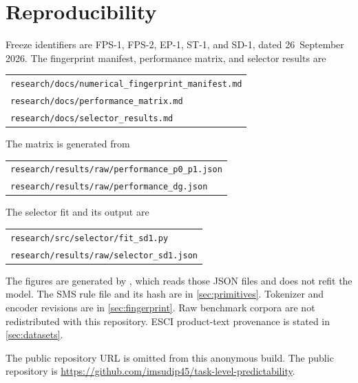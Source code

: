 \section{Reproducibility}
\label{sec:reproducibility}

Freeze identifiers are FPS-1, FPS-2, EP-1, ST-1, and SD-1, dated 26~September 2026. The fingerprint manifest, performance matrix, and selector results are
\begin{center}
\begin{tabular}{@{}l@{}}
\texttt{research/docs/numerical\_fingerprint\_manifest.md}\\
\texttt{research/docs/performance\_matrix.md}\\
\texttt{research/docs/selector\_results.md}
\end{tabular}
\end{center}
The matrix is generated from
\begin{center}
\begin{tabular}{@{}l@{}}
\texttt{research/results/raw/performance\_p0\_p1.json}\\
\texttt{research/results/raw/performance\_dg.json}
\end{tabular}
\end{center}
The selector fit and its output are
\begin{center}
\begin{tabular}{@{}l@{}}
\texttt{research/src/selector/fit\_sd1.py}\\
\texttt{research/results/raw/selector\_sd1.json}
\end{tabular}
\end{center}
The figures are generated by , which reads those JSON files and does not refit the model. The SMS rule file and its hash are in \cref{sec:primitives}. Tokenizer and encoder revisions are in \cref{sec:fingerprint}. Raw benchmark corpora are not redistributed with this repository. ESCI product-text provenance is stated in \cref{sec:datasets}.

\ifanonymous
The public repository URL is omitted from this anonymous build.
\else
The public repository is \url{https://github.com/imsudip45/task-level-predictability}.
\fi
